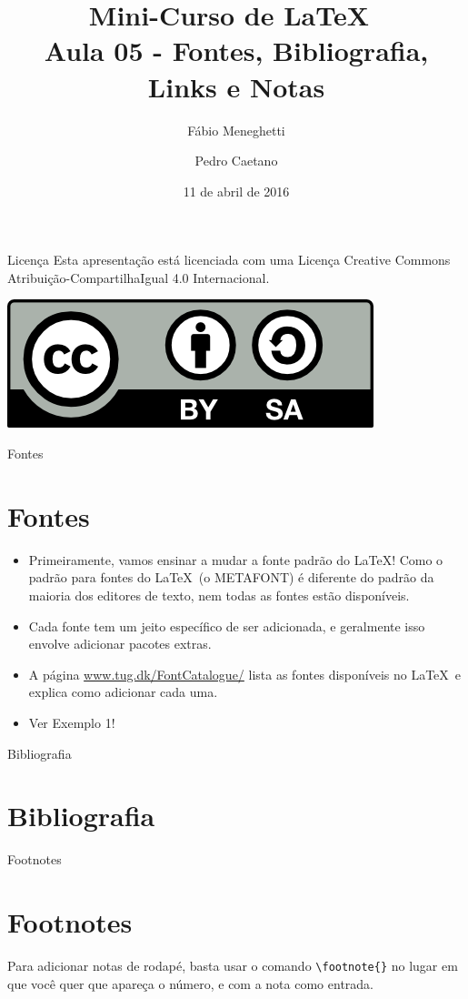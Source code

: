 \documentclass[12pt]{beamer}
\title{Mini-Curso de \LaTeX\ \\ Aula 05 - Fontes, Bibliografia, Links e Notas}
\author{Fábio Meneghetti \and Pedro Caetano}
\date{11 de abril de 2016}
\begin{document}
\begin{frame}
  \titlepage
\end{frame}

\begin{frame}{Licença}
  Esta apresentação está licenciada com uma Licença Creative Commons Atribuição-CompartilhaIgual 4.0 Internacional.
  \begin{center}
    \includegraphics[scale=0.3]{../license.png}
  \end{center}
\end{frame}

\begin{frame}
  \tableofcontents
\end{frame}

\begin{frame}{Fontes}
  \section{Fontes}
  \begin{itemize}
    \item Primeiramente, vamos ensinar a mudar a fonte padrão do \LaTeX! Como o padrão para fontes do \LaTeX\ (o METAFONT) é diferente do padrão da maioria dos editores de texto, nem todas as fontes estão disponíveis.
    \item Cada fonte tem um jeito específico de ser adicionada, e geralmente isso envolve adicionar pacotes extras.
    \item A página \url{www.tug.dk/FontCatalogue/} lista as fontes disponíveis no \LaTeX\ e explica como adicionar cada uma.
    \item Ver Exemplo 1!
  \end{itemize}
\end{frame}

\begin{frame}{Bibliografia}
  \section{Bibliografia}
\end{frame}

\begin{frame}[fragile]{Footnotes}
  \section{Footnotes}

  Para adicionar notas de rodapé, basta usar o comando \verb+\footnote{}+ no lugar em que você quer que apareça o número, e com a nota como entrada.
\end{frame}
\end{document}
